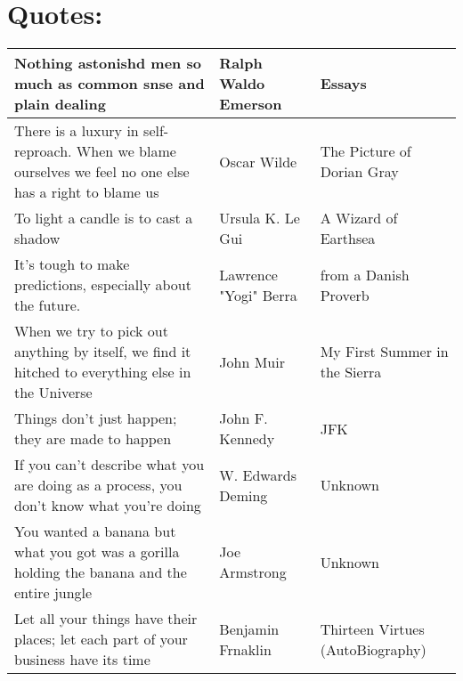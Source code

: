\documentclass{article}
\begin{document}
\section*{Quotes:}
    \begin{tabularx}{0.8\textwidth} { 
      | >{\centering\arraybackslash}X 
      | >{\centering\arraybackslash}X 
      |  >{\centering\arraybackslash}X |}
        \hline
        Nothing astonishd men so much as common snse and plain dealing
        & Ralph Waldo Emerson
        & Essays \\
    
        \hline
    
        There is a luxury in self-reproach. When we blame ourselves we feel no one else has a right to blame us
        & Oscar Wilde
        & The Picture of Dorian Gray \\
    
        \hline
    
        To light a candle is to cast a shadow
        & Ursula K. Le Gui
        & A Wizard of Earthsea\\
    
        \hline
    
        It's tough to make predictions, especially about the future.
        & Lawrence "Yogi" Berra
        & from a Danish Proverb\\
    
        \hline
    
        When we try to pick out anything by itself, we find it hitched to everything else in the Universe
        & John Muir
        &My First Summer in the Sierra \\
    
        \hline
    
        Things don't just happen; they are made to happen
        & John F. Kennedy
        & JFK\\
    
        \hline
    
        If you can't describe what you are doing as a process, you don't know what you're doing
        & W. Edwards Deming
        & Unknown\\
    
        \hline
    
        You wanted a banana but what you got was a gorilla holding the banana and the entire jungle
        & Joe Armstrong 
        & Unknown\\
    
        \hline
    
        Let all your things have their places; let each part of your business have its time
        & Benjamin Frnaklin
        & Thirteen Virtues (AutoBiography) \\
    
        \hline
    \end{tabularx}
\end{document}
